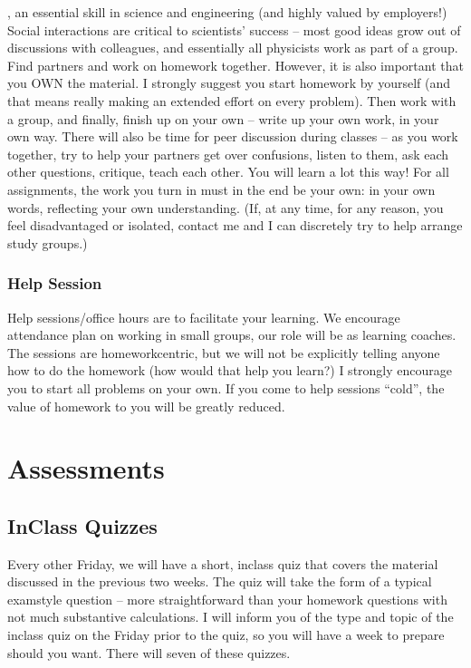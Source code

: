 \documentclass[letterpaper,10pt,english]{jupyterBook}
\begin{document}
\sphinxAtStartPar
{}, an essential skill in science and engineering (and highly valued by employers!) Social interactions are critical to scientists’ success – most good ideas grow out of discussions with colleagues, and essentially all physicists work as part of a group. Find partners and work on homework together. However, it is also important that you OWN the material. I strongly suggest you start homework by yourself (and that means really making an extended effort on every problem). Then work with a group, and finally, finish up on your own – write up your own work, in your own way. There will also be time for peer discussion during classes – as you work together, try to help your partners get over confusions, listen to them, ask each other questions, critique, teach each other. You will learn a lot this way! For all assignments, the work you turn in must in the end be your own: in your own words, reflecting your own understanding. (If, at any time, for any reason, you feel disadvantaged or isolated, contact me and I can discretely try to help arrange study groups.)


\subsubsection{Help Session}
\label{\detokenize{content/0_course/design:help-session}}
\sphinxAtStartPar
Help sessions/office hours are to facilitate your learning. We encourage attendance \sphinxhyphen{} plan on working in small groups, our role will be as learning coaches. The sessions are homework\sphinxhyphen{}centric, but we will not be explicitly telling anyone how to do the homework (how would that help you learn?) I strongly encourage you to start all problems on your own. If you come to help sessions “cold”, the value of homework to you will be greatly reduced.

\sphinxstepscope


\section{Assessments}
\label{\detokenize{content/0_course/assessments:assessments}}\label{\detokenize{content/0_course/assessments::doc}}

\subsection{In\sphinxhyphen{}Class Quizzes}
\label{\detokenize{content/0_course/assessments:in-class-quizzes}}
\sphinxAtStartPar
Every other Friday, we will have a short, in\sphinxhyphen{}class quiz that covers the material discussed in the previous two weeks. The quiz will take the form of a typical exam\sphinxhyphen{}style question – more straight\sphinxhyphen{}forward than your homework questions with not much substantive calculations. I will inform you of the type and topic of the in\sphinxhyphen{}class quiz on the Friday prior to the quiz, so you will have a week to prepare should you want. There will seven of these quizzes. 
\end{document}
